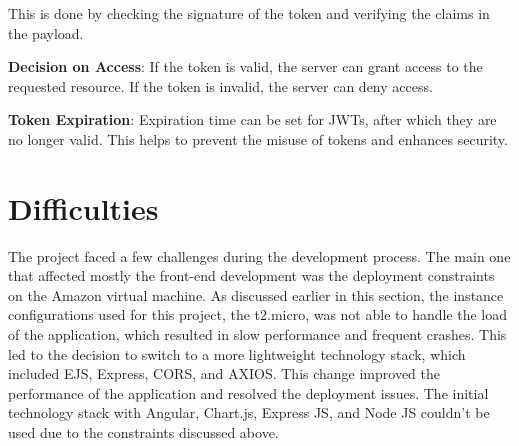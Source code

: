 This is done by checking the signature of the token and verifying the claims in the payload.

\textbf{Decision on Access}: If the token is valid, the server can grant access to the requested resource. If the token is invalid, the server can deny access.

\textbf{Token Expiration}: Expiration time can be set for JWTs, after which they are no longer valid. This helps to prevent the misuse of tokens and enhances security.


\section{Difficulties}

The project faced a few challenges during the development process. The main one that affected mostly the front-end development was the deployment constraints 
on the Amazon virtual machine. As discussed earlier in this section, the instance configurations used for this project, the t2.micro, was not able to handle the
load of the application, which resulted in slow performance and frequent crashes. This led to the decision to switch to a more lightweight technology stack,
which included EJS, Express, CORS, and AXIOS. This change improved the performance of the application and resolved the deployment issues.
The initial technology stack with Angular, Chart.js, Express JS, and Node JS couldn't be used due to the constraints discussed above.
